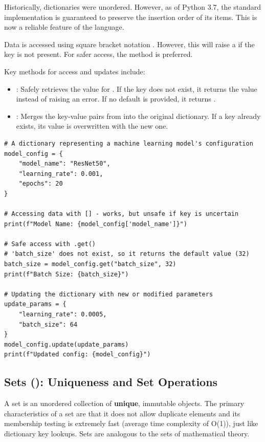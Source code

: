 \begin{remark}
Historically, dictionaries were unordered. However, as of Python 3.7, the standard  implementation is guaranteed to preserve the insertion order of its items. This is now a reliable feature of the language.
\end{remark}

Data is accessed using square bracket notation . However, this will raise a  if the key is not present. For safer access, the  method is preferred.

Key methods for access and updates include:
\begin{itemize}
    \item \textbf{}: Safely retrieves the value for . If the key does not exist, it returns the  value instead of raising an error. If no default is provided, it returns .
    \item \textbf{}: Merges the key-value pairs from  into the original dictionary. If a key already exists, its value is overwritten with the new one.
\end{itemize}

\begin{example}
\text{ }\begin{verbatim}
# A dictionary representing a machine learning model's configuration
model_config = {
    "model_name": "ResNet50",
    "learning_rate": 0.001,
    "epochs": 20
}

# Accessing data with [] - works, but unsafe if key is uncertain
print(f"Model Name: {model_config['model_name']}")

# Safe access with .get()
# 'batch_size' does not exist, so it returns the default value (32)
batch_size = model_config.get("batch_size", 32)
print(f"Batch Size: {batch_size}")

# Updating the dictionary with new or modified parameters
update_params = {
    "learning_rate": 0.0005,
    "batch_size": 64
}
model_config.update(update_params)
print(f"Updated config: {model_config}")
\end{verbatim}
\end{example}

\subsection{Sets (): Uniqueness and Set Operations}
\label{subsec:sets}
A set is an unordered collection of \textbf{unique}, immutable objects. The primary characteristics of a set are that it does not allow duplicate elements and its membership testing is extremely fast (average time complexity of O(1)), just like dictionary key lookups. Sets are analogous to the sets of mathematical theory.

